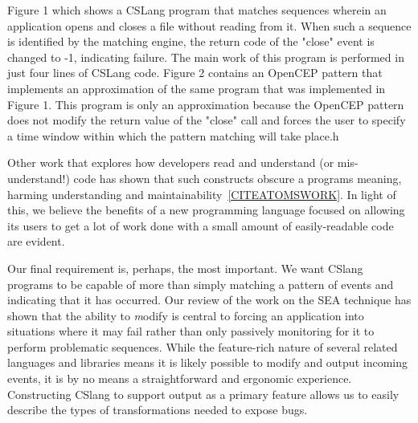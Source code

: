 Figure 1 which shows a CSLang program that matches sequences wherein an
application opens and closes a file without reading from it. When such a
sequence is identified by the matching engine, the return code of the
"close" event is changed to -1, indicating failure. The main work of this
program is performed in just four lines of CSLang code.  Figure 2 contains
an OpenCEP\cite{open_cep_website} pattern that implements an approximation
of the same program that was implemented in Figure 1. This program is only
an approximation because the OpenCEP pattern does not modify the return
value of the "close" call and forces the user to specify a time window
within which the pattern matching will take place.h

Other work that explores how developers read and
understand (or mis-understand!) code has shown that such constructs obscure
a programs meaning, harming understanding and
maintainability~\ref{CITEATOMSWORK}.
In light of this, we believe the benefits of a
new programming language
focused on allowing its users to get a lot of work done
with a small amount of easily-readable code are evident.


Our final requirement is, perhaps, the most important.
We want CSlang programs to be capable of more than simply matching
a pattern of events and indicating that it has occurred.
Our review of the work on the SEA technique has shown that the ability to
{\textit modify} is central to forcing an application into situations where
it may fail rather than only passively monitoring for it to perform
problematic sequences.  While the feature-rich nature of several related
languages and libraries means it is likely possible to modify and output
incoming events, it is by no means a straightforward
and ergonomic experience.
Constructing CSlang to support output as a primary feature allows us to
easily describe the types of transformations needed to expose bugs.


